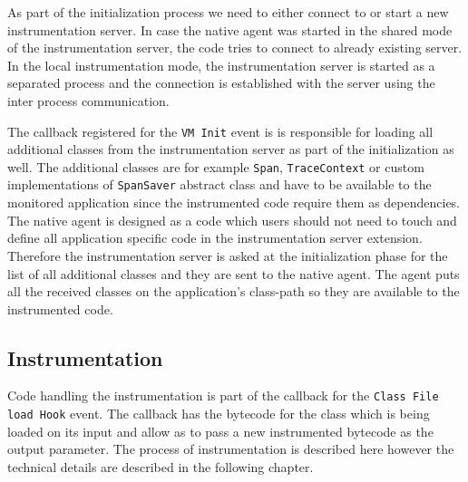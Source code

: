 As part of the initialization process we need to either connect to or start a new instrumentation server. In case the native agent was started in the shared mode of the instrumentation server, the code tries to connect to already existing server. In the local instrumentation mode, the instrumentation server is started as a separated process and the connection is established with the server using the inter process communication. 

The callback registered for the \texttt{VM Init} event is is responsible for loading all additional classes from the instrumentation server as part of the initialization as well. The additional classes are for example \texttt{Span}, \texttt{TraceContext} or custom implementations of \texttt{SpanSaver} abstract class and have to be available to the monitored application since the instrumented code require them as dependencies. The native agent is designed as a code which users should not need to touch and define all application specific code in the instrumentation server extension. Therefore the instrumentation server is asked at the initialization phase for the list of all additional classes and they are sent to the native agent. The agent puts all the received classes on the application's class-path so they are available to the instrumented code.

\subsection{Instrumentation}
Code handling the instrumentation is part of the callback for the \texttt{Class File load Hook} event. The callback has the bytecode for the class which is being loaded on its input and allow as to pass a new instrumented bytecode as the output parameter. The process of instrumentation is described here however the technical details are described in the following chapter.


